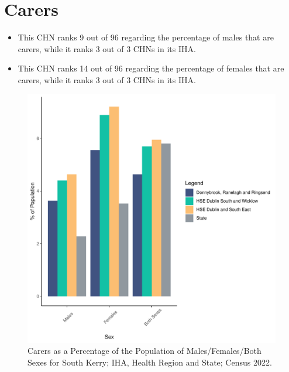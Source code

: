 \documentclass{article}
\begin{document}
\section{Carers}\label{sect:Carers}
\begin{itemize}
\item This CHN ranks  9 out of 96 regarding the percentage of males that are carers, while it ranks   3 out of 3 CHNs in its IHA.
\item This CHN ranks  14 out of 96 regarding the percentage of females that are carers, while it ranks   3 out of 3 CHNs in its IHA.
\end{itemize}
\begin{figure}[H]
	\centering
	\includegraphics[width = 150mm]{../figures/CareED.pdf}
	\caption{Carers as a Percentage of the Population of Males/Females/Both Sexes for South Kerry; IHA, Health Region and State; Census 2022.}
	\label{fig:2ae19629-1a6a-13a3-e055-000000000001}
	\end{figure}
\end{document}
